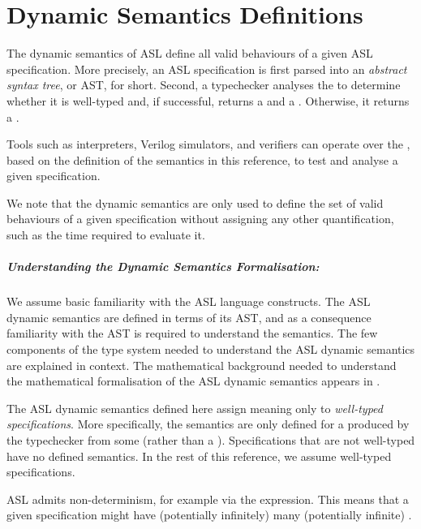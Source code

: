 
\chapter{Dynamic Semantics Definitions\label{chap:Semantics}}

The dynamic semantics of ASL define all valid behaviours of a given ASL specification.
More precisely, an ASL specification is first parsed into an \emph{abstract syntax tree},
or AST, for short. Second, a typechecker analyses the \emph{\untypedast} to determine whether it
is well-typed and, if successful, returns a \emph{\staticenvironmentterm{}} and a \emph{\typedast}.
Otherwise, it returns a \typingerrorterm{}.

Tools such as interpreters, Verilog simulators, and verifiers can operate over the \typedast,
based on the definition of the semantics in this reference, to test and analyse a given specification.

We note that the dynamic semantics are only used to define the set of valid behaviours
of a given specification without assigning any other quantification, such as the time
required to evaluate it.

\paragraph{Understanding the Dynamic Semantics Formalisation:}
We assume basic familiarity with the ASL language constructs.
The ASL dynamic semantics are defined in terms of its AST,
and as a consequence familiarity with the AST is required to understand the semantics.
The few components of the type system needed to understand the ASL dynamic semantics are explained in context.
The mathematical background needed to understand the mathematical formalisation
of the ASL dynamic semantics appears in .

\ChapterOutline

The ASL dynamic semantics defined here assign meaning only to \emph{well-typed specifications}.
More specifically, the semantics are only defined for a \typedast{} produced by the typechecker
from some \untypedast{} (rather than a \typingerrorterm{}).
Specifications that are not well-typed have no defined semantics.
In the rest of this reference, we assume well-typed specifications.

ASL admits non-determinism, for example via the \ARBITRARY{} expression.
This means that a given specification might have (potentially infinitely) many
(potentially infinite) \derivationtreesterm.

